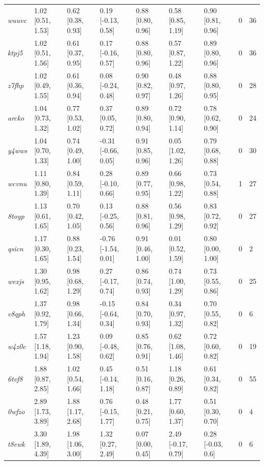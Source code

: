 \documentclass[9pt,lineno,final]{elife}
\begin{document}
\begin{table}[tb!]
\begin{center}
\begin{threeparttable}
\begin{tabular}{@{}lllllllll@{}}
\textit{wuuvc} & 1.02 [0.51, 1.53] & 0.62 [0.38, 0.93] & 0.19 [-0.13, 0.58] & 0.88 [0.80, 0.96] & 0.58 [0.85, 1.19] & 0.90 [0.81, 0.96] & 0 & 36 \\
\textit{ktpj5} & 1.02 [0.51, 1.56] & 0.61 [0.37, 0.95] & 0.17 [-0.16, 0.57] & 0.88 [0.80, 0.96] & 0.57 [0.87, 1.22] & 0.89 [0.80, 0.96] & 0 & 36 \\
\textit{z7fhp} & 1.02 [0.49, 1.55] & 0.61 [0.36, 0.94] & 0.08 [-0.24, 0.48] & 0.90 [0.82, 0.97] & 0.48 [0.97, 1.26] & 0.88 [0.80, 0.95] & 0 & 28 \\
\textit{arcko} & 1.04 [0.73, 1.32] & 0.77 [0.53, 1.02] & 0.37 [0.05, 0.72] & 0.89 [0.80, 0.94] & 0.72 [0.90, 1.14] & 0.78 [0.62, 0.90] & 0 & 24 \\
\textit{y4wws} & 1.04 [0.70, 1.33] & 0.74 [0.49, 1.00] & -0.31 [-0.66, 0.05] & 0.91 [0.85, 0.96] & 0.05 [1.02, 1.26] & 0.79 [0.68, 0.88] & 0 & 30 \\
\textit{wcvnu} & 1.11 [0.80, 1.39] & 0.84 [0.59, 1.11] & 0.28 [-0.10, 0.66] & 0.89 [0.77, 0.95] & 0.66 [0.98, 1.22] & 0.73 [0.54, 0.88] & 1 & 27 \\
\textit{8toyp} & 1.13 [0.61, 1.65] & 0.70 [0.42, 1.05] & 0.13 [-0.25, 0.56] & 0.88 [0.81, 0.96] & 0.56 [0.98, 1.29] & 0.83 [0.72, 0.92] & 0 & 27 \\
\textit{qsicn} & 1.17 [0.30, 1.65] & 0.88 [0.23, 1.54] & -0.76 [-1.54, 0.01] & 0.91 [0.46, 1.00] & 0.01 [0.52, 1.59] & 0.80 [0.00, 1.00] & 0 & 2 \\
\textit{wexjs} & 1.30 [0.95, 1.62] & 0.98 [0.68, 1.29] & 0.27 [-0.17, 0.74] & 0.86 [0.74, 0.93] & 0.74 [1.00, 1.29] & 0.73 [0.55, 0.86] & 0 & 25 \\
\textit{v8qph} & 1.37 [0.92, 1.79] & 0.98 [0.66, 1.34] & -0.15 [-0.64, 0.34] & 0.84 [0.70, 0.93] & 0.34 [0.97, 1.32] & 0.70 [0.55, 0.82] & 0 & 6 \\
\textit{w4z0e} & 1.57 [1.18, 1.94] & 1.23 [0.90, 1.58] & 0.09 [-0.48, 0.62] & 0.85 [0.76, 0.91] & 0.62 [1.08, 1.46] & 0.72 [0.60, 0.82] & 0 & 19 \\
\textit{6tvf8} & 1.88 [0.87, 2.85] & 1.02 [0.54, 1.66] & 0.45 [-0.14, 1.18] & 0.51 [0.16, 0.87] & 1.18 [0.26, 0.89] & 0.61 [0.34, 0.82] & 0 & 55 \\
\textit{0wfzo} & 2.89 [1.73, 3.89] & 1.88 [1.17, 2.68] & 0.76 [-0.15, 1.77] & 0.48 [0.21, 0.75] & 1.77 [0.60, 1.37] & 0.51 [0.30, 0.70] & 0 & 4 \\
\textit{t8ewk} & 3.30 [1.89, 4.39] & 1.98 [1.06, 3.00] & 1.32 [0.27, 2.49] & 0.07 [0.00, 0.45] & 2.49 [-0.17, 0.79] & 0.28 [-0.03, 0.6] & 0 & 6 \\

\end{tabular}
\end{threeparttable}
\end{center}
\end{table}
\end{document}
